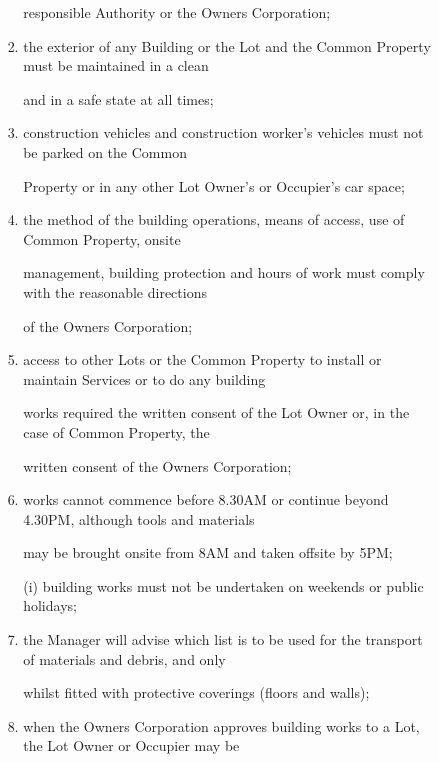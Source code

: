 \documentclass{article}
\begin{document}
\begin{enumerate}[label=\arabic*.]
\begin{enumerate}[label=\arabic{enumi}.\arabic*.]
\begin{enumerate}[label=(\arabic*)]
\begin{enumerate}[label=(\alph*)]
{\fontsize{10.02}{1}responsible Authority or the Owners Corporation; }

\item {\fontsize{9.962}{1} the exterior of any Building or the Lot and the Common Property must be maintained in a clean }

{\fontsize{10.02}{1}and in a safe state at all times; }

\item {\fontsize{9.962}{1} construction vehicles and construction worker’s vehicles must not be parked on the Common }

{\fontsize{10.02}{1}Property or in any other Lot Owner’s or Occupier’s car space; }

\item {\fontsize{9.962}{1} the method of the building operations, means of access, use of Common Property, onsite }

{\fontsize{10.02}{1}management, building protection and hours of work must comply with the reasonable directions }

{\fontsize{10.02}{1}of the Owners Corporation; }

\item {\fontsize{9.962}{1} access to other Lots or the Common Property to install or maintain Services or to do any building }

{\fontsize{10.02}{1}works required the written consent of the Lot Owner or, in the case of Common Property, the }

{\fontsize{10.02}{1}written consent of the Owners Corporation; }

\item {\fontsize{9.962}{1} works cannot commence before 8.30AM or continue beyond 4.30PM, although tools and materials }

{\fontsize{10.02}{1}may be brought onsite from 8AM and taken offsite by 5PM; }

\newpage

{\fontsize{9.962}{1}(i) building works must not be undertaken on weekends or public holidays; }

\item {\fontsize{9.962}{1} the Manager will advise which list is to be used for the transport of materials and debris, and only }

{\fontsize{10.02}{1}whilst fitted with protective coverings (floors and walls); }

\item {\fontsize{9.962}{1} when the Owners Corporation approves building works to a Lot, the Lot Owner or Occupier may be }


\end{enumerate}
\end{enumerate}
\end{enumerate}
\end{enumerate}
\end{document}
